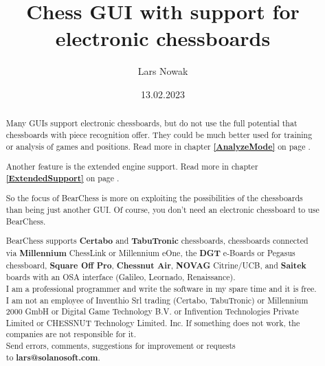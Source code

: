 \documentclass[11pt,a4paper]{article}
\title{Chess GUI with support for electronic chessboards}
\author{Lars Nowak}
\date{13.02.2023}
\begin{document}
\maketitle

\begin{abstract}

Many GUIs support electronic chessboards, but do not use the full potential that chessboards with piece recognition offer. They could be much better used for training or analysis of games and positions. Read more in chapter \textbf{\ref{AnalyzeMode}  } on page \pageref{AnalyzeMode}.

Another feature is the extended engine support. Read more in chapter \textbf{\ref{ExtendedSupport}  } on page \pageref{ExtendedSupport}.

So the focus of BearChess is more on exploiting the possibilities of the chessboards than being just another GUI. Of course, you don't need an electronic chessboard to use BearChess.

BearChess supports \textbf{Certabo} and \textbf{TabuTronic} chessboards, chessboards connected via \textbf{Millennium} ChessLink or Millennium eOne, the \textbf{DGT} e-Boards or Pegasus chessboard, \textbf{Square Off Pro}, \textbf{Chessnut Air}, \textbf{NOVAG} Citrine/UCB, and \textbf{Saitek} boards with an OSA interface (Galileo, Leornado, Renaissance).\\

I am a professional programmer and write the software in my spare time and it is free. I am not an employee of Inventhio Srl trading (Certabo, TabuTronic) or Millennium 2000 GmbH or Digital Game Technology B.V. or Infivention Technologies Private Limited or CHESSNUT Technology Limited. Inc. If something does not work, the companies are not responsible for it.\\

Send errors, comments, suggestions for improvement or requests\\to \textbf{lars@solanosoft.com}.

\end{abstract}

\newpage
\tableofcontents
\newpage
\end{document}
